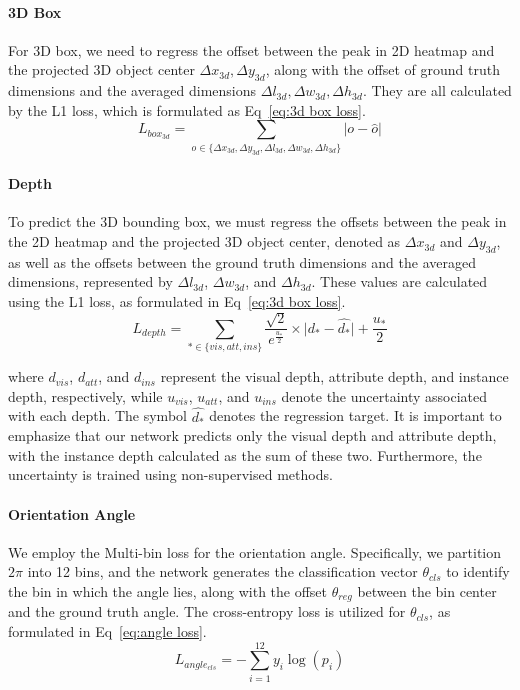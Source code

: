 \documentclass[journal]{IEEEtran}
\begin{document}
	\paragraph{3D Box}
	For 3D box, we need to regress the offset between the peak in 2D heatmap and the projected 3D object center $\Delta x_{3d}, \Delta y_{3d}$, along with the offset of ground truth dimensions and the averaged dimensions $\Delta l_{3d}, \Delta w_{3d}, \Delta h_{3d}$. They are all calculated by the L1 loss, which is formulated as Eq~\eqref{eq:3d box loss}.
	\begin{equation} 
		L_{box_{3d}} = \sum_{o\in \{\Delta{x_{3d}}, \Delta{y_{3d}}, \Delta l_{3d}, \Delta w_{3d}, \Delta h_{3d}\}}\lvert o - \hat{o} \rvert
		\label{eq:3d box loss}
	\end{equation}

	\paragraph{Depth}
	To predict the 3D bounding box, we must regress the offsets between the peak in the 2D heatmap and the projected 3D object center, denoted as $\Delta x_{3d}$ and $\Delta y_{3d}$, as well as the offsets between the ground truth dimensions and the averaged dimensions, represented by $\Delta l_{3d}$, $\Delta w_{3d}$, and $\Delta h_{3d}$. These values are calculated using the L1 loss, as formulated in Eq~\eqref{eq:3d box loss}.
	\begin{equation} 
		L_{depth} = \sum_{*\in \{vis, att, ins\}} \frac{\sqrt{2}}{e^{\frac{u_*}{2}}} \times \lvert d_* - \hat{d_*} \rvert + \frac{u_*}{2}
		\label{eq:depth loss}
	\end{equation}

	where $d_{vis}$, $d_{att}$, and $d_{ins}$ represent the visual depth, attribute depth, and instance depth, respectively, while $u_{vis}$, $u_{att}$, and $u_{ins}$ denote the uncertainty associated with each depth. The symbol $\hat{d_*}$ denotes the regression target. It is important to emphasize that our network predicts only the visual depth and attribute depth, with the instance depth calculated as the sum of these two. Furthermore, the uncertainty is trained using non-supervised methods.
	
	\paragraph{Orientation Angle}
	We employ the Multi-bin loss for the orientation angle. Specifically, we partition $2 \pi$ into 12 bins, and the network generates the classification vector $\theta_{cls}$ to identify the bin in which the angle lies, along with the offset $\theta_{reg}$ between the bin center and the ground truth angle. The cross-entropy loss is utilized for $\theta_{cls}$, as formulated in Eq~\eqref{eq:angle loss}.
	\begin{equation} 
		L_{angle_{cls}} = -\sum_{i=1}^{12} y_{i}\log(p_{i})
		\label{eq:angle loss}
	\end{equation}
\end{document}
